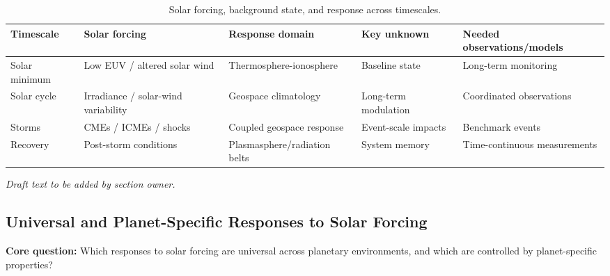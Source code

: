 \documentclass[
  draft
]{agujournal2025}
\begin{document}

\begin{table}[h]
\caption{Solar forcing, background state, and response across timescales.}
\label{tab:timescale-background-response}
\centering
\begin{tabular}{p{} p{} p{} p{} p{}}
\hline
Timescale & Solar forcing & Response domain & Key unknown & Needed observations/models \\
\hline
Solar minimum & Low EUV / altered solar wind & Thermosphere-ionosphere & Baseline state & Long-term monitoring \\
Solar cycle & Irradiance / solar-wind variability & Geospace climatology & Long-term modulation & Coordinated observations \\
Storms & CMEs / ICMEs / shocks & Coupled geospace response & Event-scale impacts & Benchmark events \\
Recovery & Post-storm conditions & Plasmasphere/radiation belts & System memory & Time-continuous measurements \\
\hline
\end{tabular}
\end{table}

\noindent\textit{Draft text to be added by section owner.}

\subsection{Universal and Planet-Specific Responses to Solar Forcing}
\noindent\textbf{Core question:} Which responses to solar forcing are universal across planetary environments, and which are controlled by planet-specific properties?
\end{document}

